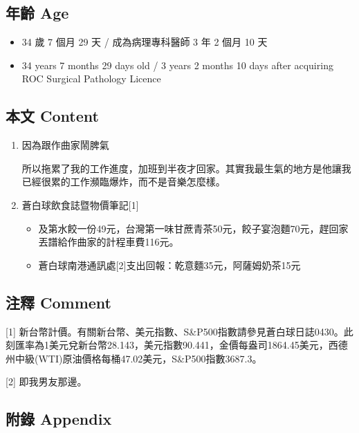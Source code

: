 \documentclass[a5paper, 10pt
]{book}
\providecommand{\tightlist}{%
  \setlength{\itemsep}{0pt}\setlength{\parskip}{0pt}}
\begin{document}
\hypertarget{ux5e74ux9f61-age-21}{%
\subsection{年齡 Age}\label{ux5e74ux9f61-age-21}}

\begin{itemize}
\tightlist
\item
  34 歲 7 個月 29 天 / 成為病理專科醫師 3 年 2 個月 10 天
\item
  34 years 7 months 29 days old / 3 years 2 months 10 days after
  acquiring ROC Surgical Pathology Licence
\end{itemize}

\hypertarget{ux672cux6587-content-21}{%
\subsection{本文 Content}\label{ux672cux6587-content-21}}

\begin{enumerate}
\def\labelenumi{\arabic{enumi}.}
\item
  因為跟作曲家鬧脾氣

  所以拖累了我的工作進度，加班到半夜才回家。其實我最生氣的地方是他讓我已經很累的工作瀕臨爆炸，而不是音樂怎麼樣。
\item
  蒼白球飲食誌暨物價筆記{[}1{]}

  \begin{itemize}
  \tightlist
  \item
    及第水餃一份49元，台灣第一味甘蔗青茶50元，餃子宴泡麵70元，趕回家丟譜給作曲家的計程車費116元。
  \item
    蒼白球南港通訊處{[}2{]}支出回報：乾意麵35元，阿薩姆奶茶15元
  \end{itemize}
\end{enumerate}

\hypertarget{ux6ce8ux91cb-comment-21}{%
\subsection{注釋 Comment}\label{ux6ce8ux91cb-comment-21}}

{[}1{]}
新台幣計價。有關新台幣、美元指數、S\&P500指數請參見蒼白球日誌0430。此刻匯率為1美元兌新台幣28.143，美元指數90.441，金價每盎司1864.45美元，西德州中級(WTI)原油價格每桶47.02美元，S\&P500指數3687.3。

{[}2{]} 即我男友那邊。

\hypertarget{ux9644ux9304-appendix-21}{%
\subsection{附錄 Appendix}\label{ux9644ux9304-appendix-21}}
\end{document}
